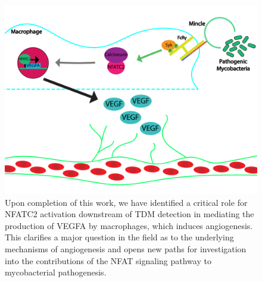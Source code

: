 \begin{figure}
\centering
\includegraphics[width=\textwidth]{images/conclusion_schematic.pdf}
\caption{Upon completion of this work, we have identified a critical role for NFATC2 activation downstream of TDM detection in mediating the production of VEGFA by macrophages, which induces angiogenesis. This clarifies a major question in the field as to the underlying mechanisms of angiogenesis and opens new paths for investigation into the contributions of the NFAT signaling pathway to mycobacterial pathogenesis.}
\label{figure:endschematic}
\end{figure}

